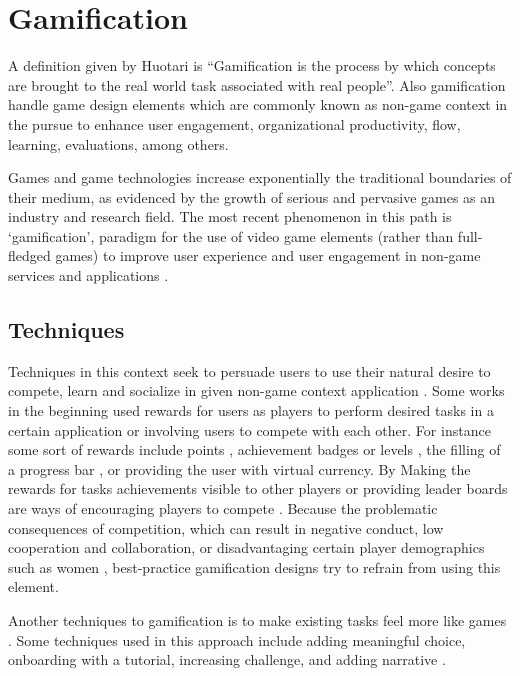 \section{Gamification}

A definition given by Huotari \cite{huotari2012defining} is “Gamification is
the process by which concepts are brought to the real world task associated with
real people”. Also gamification handle game design elements which are commonly
known as non-game context in the pursue to enhance user engagement,
organizational productivity, flow, learning, evaluations, among others.

Games and game technologies increase exponentially the traditional boundaries of
their medium, as evidenced by the growth of serious and pervasive games as an
industry and research field. The most recent phenomenon in this path is
‘gamification’, paradigm for the use of video game elements (rather than full-
fledged games) to improve user experience and user engagement in non-game
services and applications \cite{deterding2011gamification}.

\subsection{Techniques}

Techniques in this context seek to persuade users to use their natural desire to
compete, learn and socialize in given non-game context application
\cite{deterding2011game}\cite{hamari2014does}. Some works in the beginning used
rewards for users as players to perform desired tasks in a certain application
or involving users to compete with each other. For instance some sort of
rewards include points \cite{sutter2010browse}, achievement badges or levels
\cite{hamari2011framework}, the filling of a progress bar \cite{o2010get}, or
providing the user with virtual currency. By Making the rewards for tasks
achievements visible to other players or providing leader boards are ways of
encouraging players to compete \cite{hickman2010total}. Because the problematic
consequences of competition, which can result in negative conduct, low
cooperation and collaboration, or disadvantaging certain player demographics
such as women \cite{kumar2013gamification}, best-practice gamification designs
try to refrain from using this element.

Another techniques to gamification is to make existing tasks feel more like
games \cite{deterding2010just}. Some techniques used in this approach include
adding meaningful choice, onboarding with a tutorial, increasing challenge, and
adding narrative \cite{mcgonigal2011reality}.
